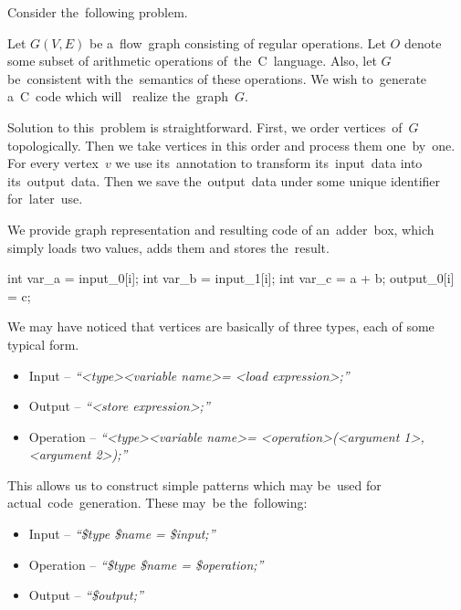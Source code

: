 Consider the~following problem.

\begin{problem}
Let $G(V,E)$ be a~flow~graph consisting of regular operations. Let $O$ denote some subset of arithmetic operations of~the~C~language. Also, let $G$ be~consistent with the~semantics of these operations. We wish to~generate a~C~code which will~ realize the~graph~$G$.
\end{problem}

\FloatBarrier

Solution to this~problem is straightforward. First, we order vertices~of~$G$ topologically. Then we take vertices in this order and process them one~by~one. For every vertex~$v$ we use its~annotation to transform its~input~data into its~output~data. Then we save the~output~data under some unique identifier for~later~use.

\parspace

We provide graph representation and resulting code of an~adder~box, which simply loads two values, adds them and stores the~result.


\begin{code}
int var_a = input_0[i];
int var_b = input_1[i];
int var_c = a + b;
output_0[i] = c;
\end{code}

\FloatBarrier

We may have noticed that vertices are basically of three types, each of some typical form. 

\begin{itemize}
  \item Input -- \emph{``\textless type\textgreater  \textless variable name\textgreater  = \textless load expression\textgreater ;''}
  \item Output -- \emph{``\textless store expression\textgreater ;''}
  \item Operation -- \emph{``\textless type\textgreater  \textless variable name\textgreater  = \textless operation\textgreater (\textless argument 1\textgreater , \textless argument 2\textgreater );''}
\end{itemize}

This allows us to construct simple patterns which may be~used for actual~code~generation. These may~be the~following:

\begin{itemize}
  \item Input -- \emph{``\$type \$name = \$input;''}
  \item Operation -- \emph{``\$type \$name = \$operation;''}
  \item Output -- \emph{``\$output;''}
\end{itemize}

